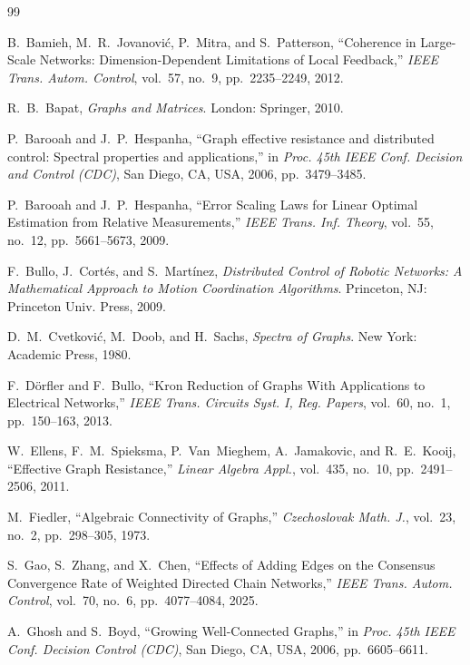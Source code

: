 \documentclass[11pt]{article}
\numberwithin{equation}{section}
\theoremstyle{definition}
\theoremstyle{remark}
\begin{document}
\begin{thebibliography}{99}
	
	B.~Bamieh, M.~R.~Jovanovi{\'c}, P.~Mitra, and S.~Patterson,
	``Coherence in Large-Scale Networks: Dimension-Dependent Limitations of Local Feedback,''
	\emph{IEEE Trans. Autom. Control}, vol.~57, no.~9, pp.~2235--2249, 2012.
	
	R.~B.~Bapat,
	\emph{Graphs and Matrices}. London: Springer, 2010.
	
	P.~Barooah and J.~P.~Hespanha,
	``Graph effective resistance and distributed control: Spectral properties and applications,''
	in \emph{Proc. 45th IEEE Conf. Decision and Control (CDC)}, San Diego, CA, USA, 2006, pp.~3479--3485.
	
	P.~Barooah and J.~P.~Hespanha,
	``Error Scaling Laws for Linear Optimal Estimation from Relative Measurements,''
	\emph{IEEE Trans. Inf. Theory}, vol.~55, no.~12, pp.~5661--5673, 2009.
	
	F.~Bullo, J.~Cort\'es, and S.~Mart\'inez,
	\emph{Distributed Control of Robotic Networks: A Mathematical Approach to Motion Coordination Algorithms}.
	Princeton, NJ: Princeton Univ. Press, 2009.
	
	D.~M.~Cvetkovi{\'c}, M.~Doob, and H.~Sachs,
	\emph{Spectra of Graphs}. New York: Academic Press, 1980.
	
	F.~D{\"o}rfler and F.~Bullo,
	``Kron Reduction of Graphs With Applications to Electrical Networks,''
	\emph{IEEE Trans. Circuits Syst. I, Reg. Papers}, vol.~60, no.~1, pp.~150--163, 2013.
	
	W.~Ellens, F.~M.~Spieksma, P.~Van~Mieghem, A.~Jamakovic, and R.~E.~Kooij,
	``Effective Graph Resistance,''
	\emph{Linear Algebra Appl.}, vol.~435, no.~10, pp.~2491--2506, 2011.
	
	M.~Fiedler,
	``Algebraic Connectivity of Graphs,''
	\emph{Czechoslovak Math. J.}, vol.~23, no.~2, pp.~298--305, 1973.
	
	S.~Gao, S.~Zhang, and X.~Chen,
	``Effects of Adding Edges on the Consensus Convergence Rate of Weighted Directed Chain Networks,''
	\emph{IEEE Trans. Autom. Control}, vol.~70, no.~6, pp.~4077--4084, 2025.
	
	A.~Ghosh and S.~Boyd,
	``Growing Well-Connected Graphs,''
	in \emph{Proc. 45th IEEE Conf. Decision Control (CDC)}, San Diego, CA, USA, 2006, pp.~6605--6611.
	

\end{thebibliography}
\end{document}
